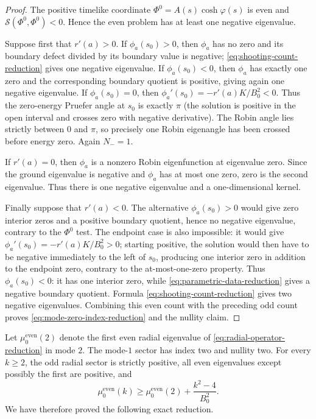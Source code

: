\documentclass[11pt]{article}
\begin{document}
\begin{proof}
The positive timelike coordinate
$\Phi^0=A(s)\cosh\varphi(s)$ is even and
$\mathcal S(\Phi^0,\Phi^0)<0$.  Hence the even problem has at least one
negative eigenvalue.

Suppose first that $r'(a)>0$.  If $\phi_a(s_0)>0$, then $\phi_a$ has no
zero and its boundary defect divided by its boundary value is negative;
\eqref{eq:shooting-count-reduction} gives one negative eigenvalue.  If
$\phi_a(s_0)<0$, then $\phi_a$ has exactly one zero and the corresponding
boundary quotient is positive, giving again one negative eigenvalue.
If $\phi_a(s_0)=0$, then
$\phi_a'(s_0)=-r'(a)K/B_0^2<0$.  Thus the zero-energy Pruefer angle
at $s_0$ is exactly $\pi$ (the solution is positive in the open
interval and crosses zero with negative derivative).  The Robin angle
lies strictly between $0$ and $\pi$, so precisely one Robin eigenangle
has been crossed before energy zero.  Again $N_-=1$.

If $r'(a)=0$, then $\phi_a$ is a nonzero Robin eigenfunction at
eigenvalue zero.  Since the ground eigenvalue is negative and $\phi_a$
has at most one zero, zero is the second eigenvalue.  Thus there is one
negative eigenvalue and a one-dimensional kernel.

Finally suppose that $r'(a)<0$.  The alternative
$\phi_a(s_0)>0$ would give zero interior zeros and a positive boundary
quotient, hence no negative eigenvalue, contrary to the $\Phi^0$ test.
The endpoint case is also impossible: it would give
$\phi_a'(s_0)=-r'(a)K/B_0^2>0$; starting positive, the solution would
then have to be negative immediately to the left of $s_0$, producing
one interior zero in addition to the endpoint zero, contrary to the
at-most-one-zero property.  Thus $\phi_a(s_0)<0$: it has one interior
zero, while \eqref{eq:parametric-data-reduction} gives a negative
boundary quotient.  Formula \eqref{eq:shooting-count-reduction} gives
two negative eigenvalues.  Combining this even count with the preceding
odd count proves \eqref{eq:mode-zero-index-reduction} and the nullity
claim.
\end{proof}

Let $\mu_0^{\mathrm{even}}(2)$ denote the first even radial eigenvalue
of \eqref{eq:radial-operator-reduction} in mode $2$.  The mode-$1$
sector has index two and nullity two.  For every $k\ge2$, the odd radial
sector is strictly positive, all even eigenvalues except possibly the
first are positive, and
\begin{equation}\label{eq:mode-monotonicity-reduction}
 \mu_0^{\mathrm{even}}(k)
 \ge \mu_0^{\mathrm{even}}(2)+\frac{k^2-4}{B_0^2}.
\end{equation}
We have therefore proved the following exact reduction.
\end{document}
